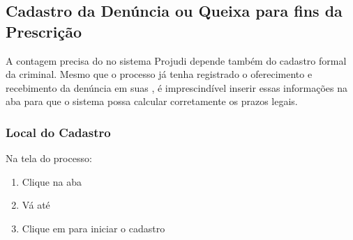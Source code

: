 \documentclass[letterpaper,10pt,brazil]{sphinxmanual}
\begin{document}
\sphinxstepscope


\subsection{Cadastro da Denúncia ou Queixa para fins da Prescrição}
\label{\detokenize{projud_53_cadastrodenuncia:cadastro-da-denuncia-ou-queixa-para-fins-da-prescricao}}\label{\detokenize{projud_53_cadastrodenuncia::doc}}
\sphinxAtStartPar
A contagem precisa do  no sistema Projudi depende também do cadastro formal da  criminal. Mesmo que o processo já tenha registrado o oferecimento e recebimento da denúncia em suas , é imprescindível inserir essas informações na aba  para que o sistema possa calcular corretamente os prazos legais.


\subsubsection{Local do Cadastro}
\label{\detokenize{projud_53_cadastrodenuncia:local-do-cadastro}}
\sphinxAtStartPar
Na tela do processo:
\begin{enumerate}
%
\item {} 
\sphinxAtStartPar
Clique na aba 

\item {} 
\sphinxAtStartPar
Vá até 

\item {} 
\sphinxAtStartPar
Clique em  para iniciar o cadastro

\end{enumerate}
\end{document}
